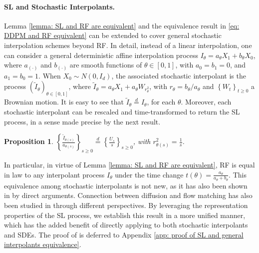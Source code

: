 \documentclass{article}
\theoremstyle{plain}
\newtheorem{proposition}[theorem]{Proposition}
\theoremstyle{definition}
\theoremstyle{remark}
\newcommand{\red}[1]{{\color{red}#1}}
\newcommand{\bc}[1]{\left\{{#1}\right\}}
\begin{document}
\paragraph{SL and Stochastic Interpolants.}
\label{sec: RF and deterministic interpolants}
Lemma  \ref{lemma: SL and RF are equivalent} and the equivalence result in \eqref{eq: DDPM and RF equivalent} can be extended to cover general stochastic interpolation \cite{albergo2023building, albergo2023stochastic} schemes beyond RF. %
In detail, instead of a linear interpolation, one can consider a general deterministic affine interpolation process $I_\theta = a_\theta X_1 + b_\theta X_0$, where $a_{(\cdot)}$ and $b_{(\cdot)}$ are smooth functions of $\theta \in [0,1]$, with $a_0 = b_1 = 0$, and $a_1 = b_0 = 1$. When $X_0 \sim N(0,I_d)$, the associated stochastic interpolant is the process $(\tilde I_\theta)_{\theta \in [0,1]}$, where $\tilde I_\theta = a_\theta X_1 + a_\theta W_{r^2_{\theta}}$, with $r_\theta = b_\theta/a_\theta$ and $\bc{W_t}_{t\ge 0}$  a Brownian motion. It is easy to see that $\tilde I_\theta \overset{d}{=} I_\theta$, for each $\theta$. Moreover, each stochastic interpolant can be rescaled and time-transformed to return the SL process, in a sense made precise by the next result. %
\begin{proposition}
\label{prop: SL and general interpolant are equivalent}
  $\bc{\frac{\tilde I_{\theta(s)}}{a_{\theta(s)}}}_{s\ge 0 } \overset{d}{=} \bc{\frac{U_s}{s}}_{s\ge 0}$, with $r^2_{\theta(s)} = \frac{1}{s}$.  
\end{proposition}


In particular, in virtue of Lemma \ref{lemma: SL and RF are equivalent}, RF is equal in law to any interpolant process $I_\theta$ under the time change $t(\theta) = \frac{a_\theta}{a_\theta + b_\theta}$. This equivalence among stochastic interpolants is not new, as it has also been shown in \citet{Liu2024_FlowNotes}  by direct arguments. Connection between diffusion and flow matching has also been studied in \citet{albergo2023stochastic, albergo2022building,gao2025diffusionmeetsflow, ma2024sit, rout2025semantic} through different perspectives.
By leveraging the representation properties of the SL process, we establish this result in a more unified manner, which has the added benefit of directly applying to both stochastic interpolants and SDEs. The proof of  is deferred to Appendix \ref{app: proof of SL and general interpolants equivalence}.
\end{document}
